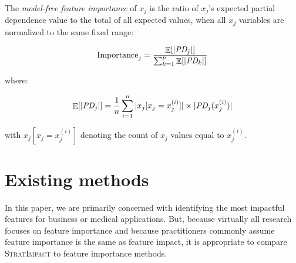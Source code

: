 \documentclass[11pt]{article}
\newcommand{\eqnref}[1]{Equation~\ref{#1}}
\newcommand{\cut}[1]{}
\DeclareMathOperator{\Ex}{\mathbb{E}}
\newcommand{\simp}{\fontfamily{cmr}\textsc{\small StratImpact}}
\begin{document}
\cut{
While feature importances should not be interpreted as feature impacts, impacts can be effective as feature importances for model feature selection.  Features with the most impact on the response variable the most should coincide with the most predictive features. But, m

The definition of impact in \eqnref{eq:Epd2a} assumes that each $x_j$ value is equally likely, which is not the case in practice for $(\bf X, y)$ data sets. To go from partial dependence to importance, the $\text{\it PD}_j$ curve at $x_j=z$ must be weighted by the number of samples at $x_j=z$ before computing the average magnitude.  The red dots represent the $\text{\it PD}_j$ weighted according to the histogram height and the orange region represents the impact {\tt\small YearMade} has on the response variable, {\tt\small SalePrice}. While the {\tt\small YearMade} partial dependence curve is plausible before year 1990 (older bulldozers are worth less), there are so few data points that the collection of very old bulldozers should have little overall effect on the overall average sale price.  This leads to a definition based upon expected value rather than simple averages across $x_j$ domains.
}

~\\
 The {\em model-free feature importance} of $x_j$ is the ratio of $x_j$'s expected partial dependence value to the total of all expected values, when all $x_j$ variables are normalized to the same fixed range:

\begin{equation}\label{eq:Epd2b}
\text{Importance}_j = \frac{\Ex[|\text{\it PD}_j|]}{\sum_{k=1}^p \Ex[|\text{\it PD}_k|]}
\end{equation}

\noindent where:

\begin{equation}\label{eq:Epd2c}
\Ex[|\text{\it PD}_j|] = \frac{1}{n} \sum_{i=1}^{n} |x_j[x_j=x_j^{(i)}]| \times  |\text{\it PD}_j(x_j^{(i)})|
\end{equation}

\noindent with $x_j[x_j=x_j^{(i)}]$ denoting the count of $x_j$ values equal to $x_j^{(i)}$.

\section{Existing methods}\label{sec:existing}

In this paper, we are primarily concerned with identifying the most impactful features for business or medical applications. But, because virtually all research focuses on feature importance and because practitioners commonly assume feature importance is the same as feature impact, it is appropriate to compare \simp{} to  feature importance methods.
\end{document}
